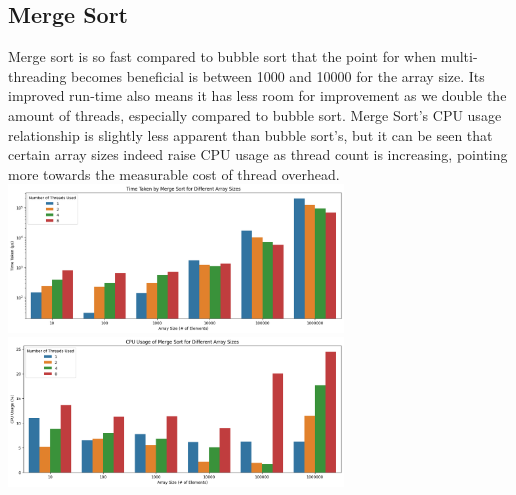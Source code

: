 \documentclass[conference]{IEEEtran}
\begin{document}
\subsection{Merge Sort}
Merge sort is so fast compared to bubble sort that the point for when multi-threading becomes beneficial is between 1000 and 10000 for the array size. Its improved run-time also means it has less room for improvement as we double the amount of threads, especially compared to bubble sort.
Merge Sort's CPU usage relationship is slightly less apparent than bubble sort's, but it can be seen that certain array sizes indeed raise CPU usage as thread count is increasing, pointing more towards the measurable cost of thread overhead.
\includegraphics[width=3.5in]{MergeSortTimeTaken.png}
\includegraphics[width=3.5in]{MergeSortCPUUsage.png}
\end{document}
